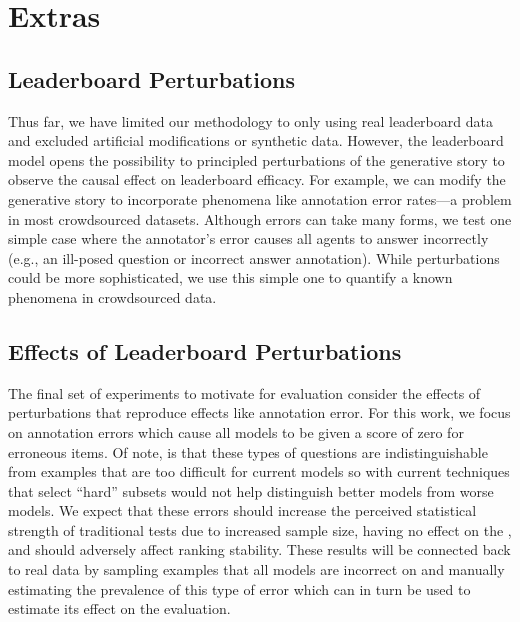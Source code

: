 \section{Extras}


\subsection{Leaderboard Perturbations}

Thus far, we have limited our methodology to only using real leaderboard data and excluded artificial modifications or synthetic data.
However, the \irt{} leaderboard model opens the possibility to principled perturbations of the generative story to observe the causal effect on leaderboard efficacy.
For example, we can modify the generative story to incorporate phenomena like annotation error rates---a problem in most crowdsourced datasets.
Although errors can take many forms, we test one simple case where the annotator's error causes all agents to answer incorrectly (e.g., an ill-posed question or incorrect answer annotation).
While perturbations could be more sophisticated, we use this simple one to quantify a known phenomena in crowdsourced data.


\subsection{Effects of Leaderboard Perturbations}

The final set of experiments to motivate \irt{} for evaluation consider the effects of perturbations that reproduce effects like annotation error.
For this work, we focus on annotation errors which cause all models to be given a score of zero for erroneous items.
Of note, is that these types of questions are indistinguishable from examples that are too difficult for current models so with current techniques that select ``hard'' subsets would not help distinguish better models from worse models.
We expect that these errors should increase the perceived statistical strength of traditional tests due to increased sample size, having no effect on the , and should adversely affect ranking stability.
These results will be connected back to real data by sampling examples that all models are incorrect on and manually estimating the prevalence of this type of error which can in turn be used to estimate its effect on the \squad{} evaluation.

